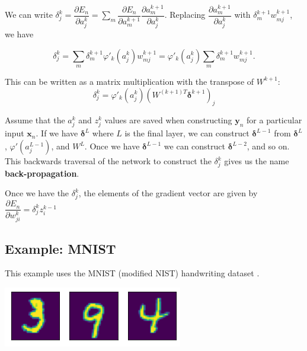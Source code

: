 \documentclass[12pt,letterpaper,noanswers]{exam}
\newcommand{\vc}[1]{\boldsymbol{#1}}
\begin{document}
\begin{tcolorbox}
We can write $\displaystyle\delta_j^k=\dfrac{\partial E_n}{\partial a_j^k}  = \sum\limits_m \dfrac{\partial E_n}{\partial a_m^{k+1}}\dfrac{\partial a_m^{k+1}}{\partial a_j^k}$.  Replacing $\dfrac{\partial a_m^{k+1}}{\partial a_j^k}$ with $\delta_m^{k+1}w^{k+1}_{mj}$, we have

\[\displaystyle\delta_j^k= \sum\limits_m \delta^{k+1}_m \varphi'_k(a_j^k)w^{k+1}_{mj} = \varphi'_k(a_j^k)\sum\limits_m \delta^{k+1}_m w^{k+1}_{mj}.\]

This can be written as a matrix multiplication with the transpose of $W^{k+1}$: \[\delta_j^k = \varphi'_k(a_j^k)(W^{(k+1)T}\vc{\delta}^{k+1})_j\]

Assume that the $a_j^k$ and $z_j^k$ values are saved when constructing $\vc{y}_n$ for a particular input $\vc{x}_n$.  If we have $\vc{\delta}^L$ where $L$ is the final layer, we can construct $\vc{\delta}^{L-1}$ from $\vc{\delta}^L$, $\varphi'(a_j^{L-1})$, and $W^{L}$.  Once we have $\vc{\delta}^{L-1}$ we can construct $\vc{\delta}^{L-2}$, and so on.  This backwards traversal of the network to construct the $\delta_j^k$ gives us the name \textbf{back-propagation}.

Once we have the $\delta_j^k$, the elements of the gradient vector are given by $\dfrac{\partial E_n}{\partial w_{ji}^k} = \delta_j^k z_i^{k-1}$
\end{tcolorbox}


\subsection*{Example: MNIST}

This example uses the MNIST (modified NIST) handwriting dataset \cite{lecun1998gradient}.

\includegraphics{img/C23mnist.png}
\end{document}
